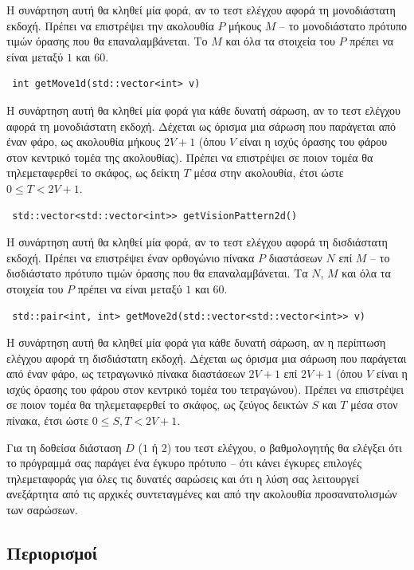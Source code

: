 \documentclass[12pt]{article}
\begin{document}
Η συνάρτηση αυτή θα κληθεί μία φορά, αν το τεστ ελέγχου αφορά τη μονοδιάστατη εκδοχή. Πρέπει να επιστρέψει την ακολουθία $P$ μήκους $M$ -- το μονοδιάστατο πρότυπο τιμών όρασης που θα επαναλαμβάνεται. Το $M$ και όλα τα στοιχεία του $P$ πρέπει να είναι μεταξύ $1$ και $60$.

\begin{lstlisting}
 int getMove1d(std::vector<int> v)
\end{lstlisting}

Η συνάρτηση αυτή θα κληθεί μία φορά για κάθε δυνατή σάρωση, αν το τεστ ελέγχου αφορά τη μονοδιάστατη εκδοχή. Δέχεται ως όρισμα μια σάρωση που παράγεται από έναν φάρο, ως ακολουθία μήκους $2V + 1$ (όπου $V$ είναι η ισχύς όρασης του φάρου στον κεντρικό τομέα της ακολουθίας). Πρέπει να επιστρέψει σε ποιον τομέα θα τηλεμεταφερθεί το σκάφος, ως δείκτη $T$ μέσα στην ακολουθία, έτσι ώστε $0 \leq T < 2V + 1$.

\begin{lstlisting}
 std::vector<std::vector<int>> getVisionPattern2d()
\end{lstlisting}

Η συνάρτηση αυτή θα κληθεί μία φορά, αν το τεστ ελέγχου αφορά τη δισδιάστατη εκδοχή. Πρέπει να επιστρέψει έναν ορθογώνιο πίνακα $P$ διαστάσεων $N$ επί $M$ -- το δισδιάστατο πρότυπο τιμών όρασης που θα επαναλαμβάνεται. Τα $N$, $M$ και όλα τα στοιχεία του $P$ πρέπει να είναι μεταξύ $1$ και $60$.

\begin{lstlisting}
 std::pair<int, int> getMove2d(std::vector<std::vector<int>> v)
\end{lstlisting}

Η συνάρτηση αυτή θα κληθεί μία φορά για κάθε δυνατή σάρωση, αν η περίπτωση ελέγχου αφορά τη δισδιάστατη εκδοχή. Δέχεται ως όρισμα μια σάρωση που παράγεται από έναν φάρο, ως τετραγωνικό πίνακα διαστάσεων $2V + 1$ επί $2V + 1$ (όπου $V$ είναι η ισχύς όρασης του φάρου στον κεντρικό τομέα του τετραγώνου). Πρέπει να επιστρέψει σε ποιον τομέα θα τηλεμεταφερθεί το σκάφος, ως ζεύγος δεικτών $S$ και $T$ μέσα στον πίνακα, έτσι ώστε $0 \leq S, T < 2V + 1$.

Για τη δοθείσα διάσταση $D$ ($1$ ή $2$) του τεστ ελέγχου, ο βαθμολογητής θα ελέγξει ότι το πρόγραμμά σας παράγει ένα έγκυρο πρότυπο -- ότι κάνει έγκυρες επιλογές τηλεμεταφοράς για όλες τις δυνατές σαρώσεις και ότι η λύση σας λειτουργεί ανεξάρτητα από τις αρχικές συντεταγμένες και από την ακολουθία προσανατολισμών των σαρώσεων.

\subsection{Περιορισμοί}
\end{document}
